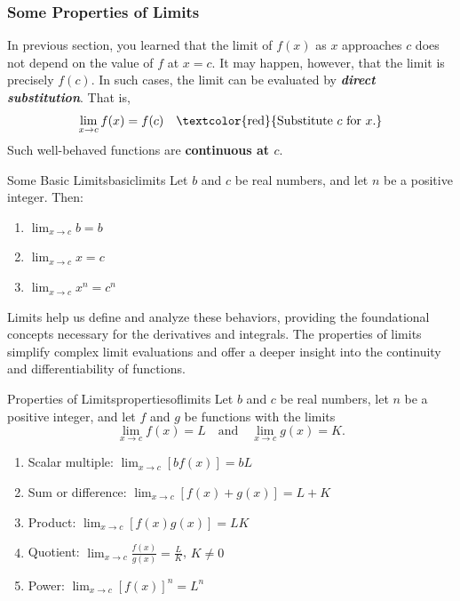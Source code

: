 \documentclass[12pt]{article}
\theoremstyle{beautifulthm}
\begin{document}
\subsubsection{Some Properties of Limits}
In previous section, you learned that the limit of \( f(x) \) as \( x \) approaches \( c \) does not depend on the value of \( f \) at \( x = c \). It may happen, however, that the limit is precisely \( f(c) \). In such cases, the limit can be evaluated by \textbf{\textit{direct substitution}}. That is,
\[
\lim_{x \to c} f(x) = f(c) \quad \text{\textcolor{red}{Substitute \( c \) for \( x \).}}
\]
Such well-behaved functions are \textbf{continuous at \( c \)}. 
\begin{mytheorem}{Some Basic Limits}{basiclimits}
Let \(b\) and \(c\) be real numbers, and let \(n\) be a positive integer. Then:
\begin{enumerate}
    \item \(\lim_{x \to c} b = b\)
    \item \(\lim_{x \to c} x = c\)
    \item \(\lim_{x \to c} x^n = c^n\)
\end{enumerate}
\end{mytheorem}

 Limits help us define and analyze these behaviors, providing the foundational concepts necessary for the derivatives and integrals. The properties of limits simplify complex limit evaluations and offer a deeper insight into the continuity and differentiability of functions.
\begin{mytheorem}{Properties of Limits}{propertiesoflimits}
Let \(b\) and \(c\) be real numbers, let \(n\) be a positive integer, and let \(f\) and \(g\) be functions with the limits
\[
\lim_{x \to c} f(x) = L \quad \text{and} \quad \lim_{x \to c} g(x) = K.
\]
\begin{enumerate}
    \item Scalar multiple: \(\lim_{x \to c} [b f(x)] = bL\)
    \item Sum or difference: \(\lim_{x \to c} [f(x) + g(x)] = L + K\)
    \item Product: \(\lim_{x \to c} [f(x) g(x)] = LK\)
    \item Quotient: \(\lim_{x \to c} \frac{f(x)}{g(x)} = \frac{L}{K}\), \(K \neq 0\)
    \item Power: \(\lim_{x \to c} [f(x)]^n = L^n\)
\end{enumerate}
\end{mytheorem}
\end{document}
